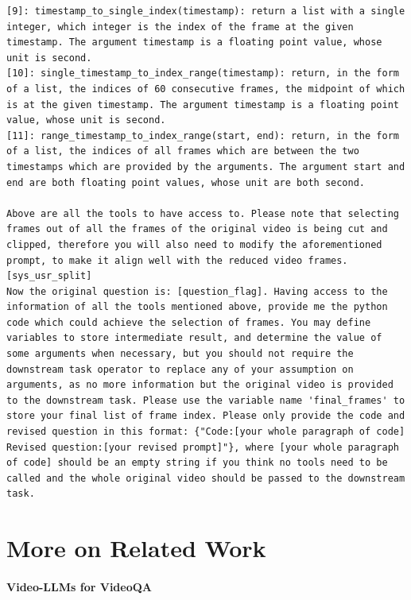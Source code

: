 \begin{lstlisting}
[9]: timestamp_to_single_index(timestamp): return a list with a single integer, which integer is the index of the frame at the given timestamp. The argument timestamp is a floating point value, whose unit is second.
[10]: single_timestamp_to_index_range(timestamp): return, in the form of a list, the indices of 60 consecutive frames, the midpoint of which is at the given timestamp. The argument timestamp is a floating point value, whose unit is second.
[11]: range_timestamp_to_index_range(start, end): return, in the form of a list, the indices of all frames which are between the two timestamps which are provided by the arguments. The argument start and end are both floating point values, whose unit are both second.

Above are all the tools to have access to. Please note that selecting frames out of all the frames of the original video is being cut and clipped, therefore you will also need to modify the aforementioned prompt, to make it align well with the reduced video frames.
[sys_usr_split]
Now the original question is: [question_flag]. Having access to the information of all the tools mentioned above, provide me the python code which could achieve the selection of frames. You may define variables to store intermediate result, and determine the value of some arguments when necessary, but you should not require the downstream task operator to replace any of your assumption on arguments, as no more information but the original video is provided to the downstream task. Please use the variable name 'final_frames' to store your final list of frame index. Please only provide the code and revised question in this format: {"Code:[your whole paragraph of code] Revised question:[your revised prompt]"}, where [your whole paragraph of code] should be an empty string if you think no tools need to be called and the whole original video should be passed to the downstream task.
\end{lstlisting}

\section{More on Related Work}
\label{appendix: related_work}

\paragraph{Video-LLMs for VideoQA}


